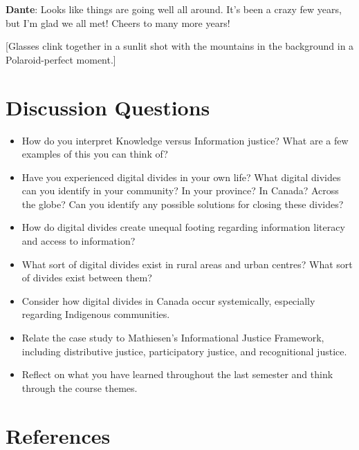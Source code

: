 \documentclass[
  letterpaper,
  DIV=11,
  numbers=noendperiod]{scrreprt}
\begin{document}
\textbf{Dante}: Looks like things are going well all around. It's been a
crazy few years, but I'm glad we all met! Cheers to many more years!

{[}Glasses clink together in a sunlit shot with the mountains in the
background in a Polaroid-perfect moment.{]}

\section{Discussion Questions}\label{discussion-questions-7}

\begin{itemize}
\item
  How do you interpret Knowledge versus Information justice? What are a
  few examples of this you can think of?
\item
  Have you experienced digital divides in your own life? What digital
  divides can you identify in your community? In your province? In
  Canada? Across the globe? Can you identify any possible solutions for
  closing these divides?
\item
  How do digital divides create unequal footing regarding information
  literacy and access to information?
\item
  What sort of digital divides exist in rural areas and urban centres?
  What sort of divides exist between them?
\item
  Consider how digital divides in Canada occur systemically, especially
  regarding Indigenous communities.
\item
  Relate the case study to Mathiesen's Informational Justice Framework,
  including distributive justice, participatory justice, and
  recognitional justice.
\item
  Reflect on what you have learned throughout the last semester and
  think through the course themes.
\end{itemize}

\section*{References}\label{references-10}
\end{document}
